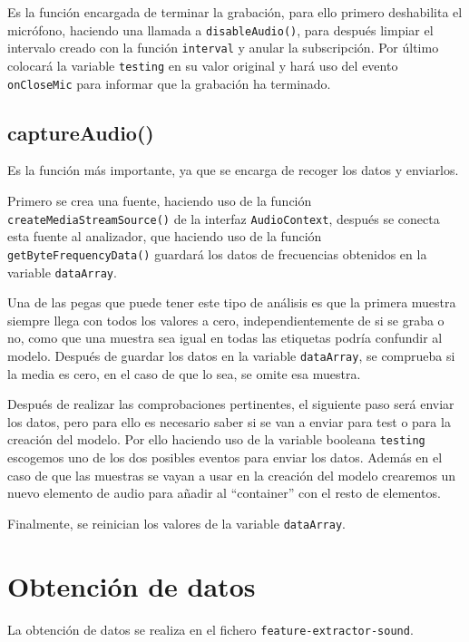\documentclass[a4paper, 12pt]{book}
\begin{document}
Es la función encargada de terminar la grabación, para ello primero deshabilita el micrófono, haciendo una llamada a \texttt{disableAudio()}, para después limpiar el intervalo creado con la función \texttt{interval} y anular la subscripción. Por último colocará la variable \texttt{testing} en su valor original y hará uso del evento \texttt{onCloseMic} para informar que la grabación ha terminado.

\subsection*{captureAudio()}

Es la función más importante, ya que se encarga de recoger los datos y enviarlos.

Primero se crea una fuente, haciendo uso de la función \texttt{createMediaStreamSource()} de la interfaz \texttt{AudioContext}, después se conecta esta fuente al analizador, que haciendo uso de la función \texttt{getByteFrequencyData()} guardará los datos de frecuencias obtenidos en la variable \texttt{dataArray}.

Una de las pegas que puede tener este tipo de análisis es que la primera muestra siempre llega con todos los valores a cero, independientemente de si se graba o no, como que una muestra sea igual en todas las etiquetas podría confundir al modelo. Después de guardar los datos en la variable \texttt{dataArray}, se comprueba si la media es cero, en el caso de que lo sea, se omite esa muestra.

Después de realizar las comprobaciones pertinentes, el siguiente paso será enviar los datos, pero para ello es necesario saber si se van a enviar para test o para la creación del modelo. Por ello haciendo uso de la variable booleana \texttt{testing} escogemos uno de los dos posibles eventos para enviar los datos. Además en el caso de que las muestras se vayan a usar en la creación del modelo crearemos un nuevo elemento de audio para añadir al ``container'' con el resto de elementos.

Finalmente, se reinician los valores de la variable \texttt{dataArray}.

\section{Obtención de datos}
\label{sec:obtencion-datos}

La obtención de datos se realiza en el fichero \texttt{feature-extractor-sound}.
\end{document}
